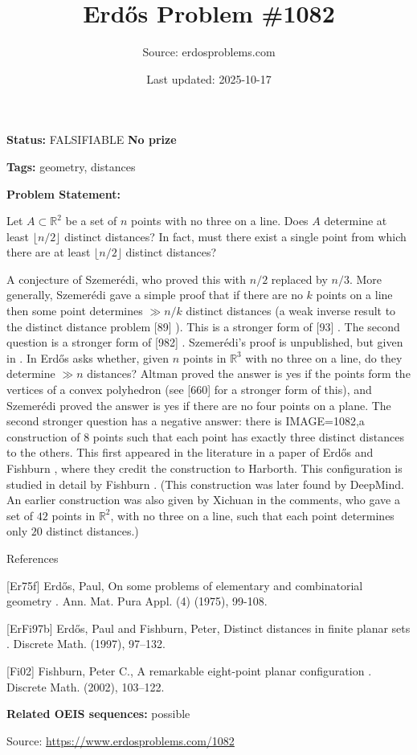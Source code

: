 \documentclass{article}
\title{Erd\H{o}s Problem \#1082}
\date{Last updated: 2025-10-17}
\author{Source: erdosproblems.com}
\begin{document}
\maketitle

\noindent\textbf{Status:} FALSIFIABLE \quad \textbf{No prize}

\noindent\textbf{Tags:} geometry, distances

\medskip

\noindent\textbf{Problem Statement:}

Let $A\subset \mathbb{R}^2$ be a set of $n$ points with no three on a line. Does $A$ determine at least $\lfloor n/2\rfloor$ distinct distances? In fact, must there exist a single point from which there are at least $\lfloor n/2\rfloor$ distinct distances?




A conjecture of Szemer\'{e}di, who proved this with $n/2$ replaced by $n/3$. More generally, Szemer\'{e}di gave a simple proof that if there are no $k$ points on a line then some point determines $\gg n/k$ distinct distances (a weak inverse result to the distinct distance problem [89] ). This is a stronger form of [93] . The second question is a stronger form of [982] . Szemer\'{e}di's proof is unpublished, but given in \cite{Er75f}. In \cite{Er75f} Erd\H{o}s asks whether, given $n$ points in $\mathbb{R}^3$ with no three on a line, do they determine $\gg n$ distances? Altman proved the answer is yes if the points form the vertices of a convex polyhedron (see [660] for a stronger form of this), and Szemer\'{e}di proved the answer is yes if there are no four points on a plane. The second stronger question has a negative answer: there is {IMAGE=1082,a construction} of $8$ points such that each point has exactly three distinct distances to the others. This first appeared in the literature in a paper of Erd\H{o}s and Fishburn \cite{ErFi97b}, where they credit the construction to Harborth. This configuration is studied in detail by Fishburn \cite{Fi02}. (This construction was later found by DeepMind. An earlier construction was also given by Xichuan in the comments, who gave a set of $42$ points in $\mathbb{R}^2$, with no three on a line, such that each point determines only $20$ distinct distances.)




References

[Er75f] Erd\H{o}s, Paul, On some problems of elementary and combinatorial geometry . Ann. Mat. Pura Appl. (4) (1975), 99-108.

[ErFi97b] Erd\H{o}s, Paul and Fishburn, Peter, Distinct distances in finite planar sets . Discrete Math. (1997), 97--132.

[Fi02] Fishburn, Peter C., A remarkable eight-point planar configuration . Discrete Math. (2002), 103--122.

\noindent\textbf{Related OEIS sequences:} possible

\bigskip
\noindent\small{Source: \url{https://www.erdosproblems.com/1082}}
\end{document}
